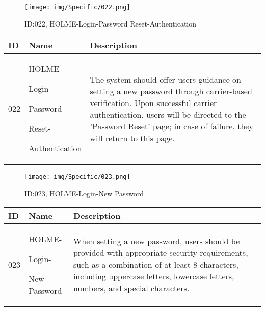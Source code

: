 \documentclass[conference]{IEEEtran}
\begin{document}
\begin{enumerate}
\begin{figure}[h]
\centering
\texttt{[image: img/Specific/022.png]}
\caption{ID:022, HOLME-Login-Password Reset-Authentication}
\end{figure}
\begin{table}[h]
\def\arraystretch{1.2} \small
    \begin{tabular}{|p{1cm}|p{1.8cm}|p{5.0cm}|}
        \hline
        ID & Name & Description\\ \hline
         022 \par  & HOLME-\par Login-\par Password \par Reset- \par Authentication &The system should offer users guidance on setting a new password through carrier-based verification. Upon successful carrier authentication, users will be directed to the 'Password Reset' page; in case of failure, they will return to this page.\\ \hline
    \end{tabular}
\end{table}

\begin{figure}[h]
\centering
\texttt{[image: img/Specific/023.png]}
\caption{ID:023, HOLME-Login-New Password}
\end{figure}
\begin{table}[h]
\def\arraystretch{1.2} \small
    \begin{tabular}{|p{1cm}|p{1.8cm}|p{5.0cm}|}
        \hline
        ID & Name & Description\\ \hline
         023 \par  & HOLME-\par Login-\par New Password&When setting a new password, users should be provided with appropriate security requirements, such as a combination of at least 8 characters, including uppercase letters, lowercase letters, numbers, and special characters.\\ \hline
    \end{tabular}
\end{table}


\end{enumerate}
\end{document}
